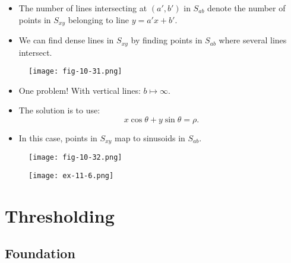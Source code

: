 \begin{frame}
\begin{itemize}
\item The number of lines intersecting at $(a',b')$ in $S_{ab}$ denote the number of points in $S_{xy}$ belonging to line $y = a'x + b'$.
\item We can find dense lines in $S_{xy}$ by finding points in $S_{ab} $ where several lines intersect.
\end{itemize}
\begin{figure}[!h]
\texttt{[image: fig-10-31.png]}
\end{figure}
\end{frame}

\begin{frame}
\begin{itemize}
\item One problem! With vertical lines: $b \mapsto \infty$.
\item The solution is to use:
\begin{equation}
x\cos\theta + y\sin\theta = \rho.
\end{equation}
\item In this case, points in $S_{xy}$ map to sinusoids in $S_{ab}$.
\end{itemize}
\begin{figure}[!h]
\texttt{[image: fig-10-32.png]}
\end{figure}
\end{frame}

\begin{frame}
\begin{figure}[!h]
\texttt{[image: ex-11-6.png]}
\end{figure}
\end{frame}


\section{Thresholding}

\subsection{Foundation}

